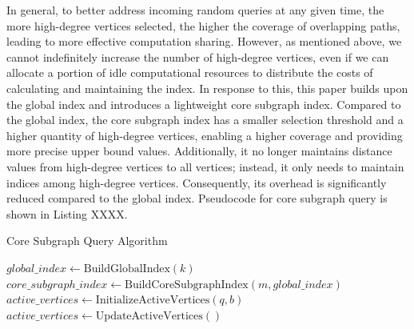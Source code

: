 \documentclass[lettersize,journal]{IEEEtran} %
\begin{document}
In general, to better address incoming random queries at any given time, the more high-degree vertices selected, the higher the coverage of overlapping paths, leading to more effective computation sharing. However, as mentioned above, we cannot indefinitely increase the number of high-degree vertices, even if we can allocate a portion of idle computational resources to distribute the costs of calculating and maintaining the index. In response to this, this paper builds upon the global index and introduces a lightweight core subgraph index. Compared to the global index, the core subgraph index has a smaller selection threshold and a higher quantity of high-degree vertices, enabling a higher coverage and providing more precise upper bound values. Additionally, it no longer maintains distance values from high-degree vertices to all vertices; instead, it only needs to maintain indices among high-degree vertices. Consequently, its overhead is significantly reduced compared to the global index. Pseudocode for core subgraph query is shown in Listing XXXX.

\begin{algorithm}
    \caption{Core Subgraph Query Algorithm}
    \begin{algorithmic}[1]
    \State $global\_index \gets \text{BuildGlobalIndex}(k)$ 
    \State $core\_subgraph\_index \gets \text{BuildCoreSubgraphIndex}(m, global\_index)$ 
        \State $active\_vertices \gets \text{InitializeActiveVertices}(q, b)$ 
        \State {} 
                    \State {}
                \Else
                     
                        \State {}
                    \EndFor
                \EndIf
            \EndFor
            \State $active\_vertices \gets \text{UpdateActiveVertices}()$
        \EndWhile
    \EndFunction
    \end{algorithmic}
    \end{algorithm}
\end{document}
